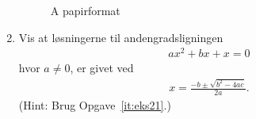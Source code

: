 \begin{enumerate}
\begin{figure}
	\centering
	\caption{A papirformat}
	\label{fig:2deglig1}
\end{figure}

\item Vis at løsningerne til andengradsligningen
\begin{align*}
ax^{2}+bx+x=0
\end{align*}
hvor $a\neq0$, er givet ved 
\begin{align*}
x=\frac{-b\pm \sqrt{b^2-4ac}}{2a}.
\end{align*}
(Hint: Brug Opgave~\ref{it:eks21}.)
\end{enumerate}
